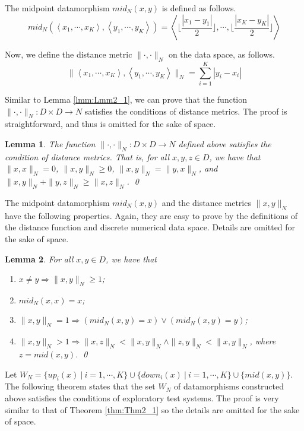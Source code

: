 \documentclass[preprint,1p,authoryear,times]{elsarticle}
\newtheorem{Lemma}{Lemma}
\begin{document}
The midpoint datamorphism $mid_N(x,y)$ is defined as follows. 
\begin{equation}
mid_N(\left<x_1, \cdots, x_K\right>, \left<y_1, \cdots, y_K\right>) = \left<\lfloor \frac{|x_1 - y_1|}{2}\rfloor, \cdots, \lfloor \frac{|x_K - y_K|}{2}\rfloor\right>
\end{equation}

Now, we define the distance metric $\|\cdot,\cdot\|_N$ on the data space, as follows. 
\begin{equation}
\|\left<x_1, \cdots, x_K\right>, \left<y_1, \cdots, y_K\right>\|_N = \sum^K_{i=1}{|y_i - x_i|}
\end{equation}

Similar to Lemma \ref{lmm:Lmm2_1}, we can prove that the function $\| \cdot, \cdot \|_N : D \times D \rightarrow N$ satisfies the conditions of distance metrics. The proof is straightforward, and thus is omitted for the sake of space. 
\begin{Lemma}
The function $\|\cdot,\cdot \|_N: D \times D \rightarrow N$ defined above satisfies the condition of distance metrics. That is, for all $x,y,z \in D$, we have that $\|x, x\|_N=0$, $\|x,y\|_N\geq 0$, $\|x,y\|_N = \|y,x\|_N$, and $\|x,y\|_N + \|y,z\|_N \geq \|x,z\|_N$. \qed
\end{Lemma}

The midpoint datamorphism $mid_N(x,y)$ and the distance metrics $\|x,y\|_N$ have the following properties. Again, they are easy to prove by the definitions of the distance function and discrete numerical data space. Details are omitted for the sake of space.
\begin{Lemma}\label{lmm:Lmm2_3}
For all $x,y \in D$, we have that 
\begin{enumerate}
\item $x \neq y \Rightarrow \|x,y\|_N \geq 1$;
\item $mid_N(x,x) = x$;
\item $\|x,y\|_N = 1 \Rightarrow (mid_N(x,y)=x) \vee (mid_N(x,y)=y)$;
\item $\|x,y\|_N > 1 \Rightarrow \|x,z\|_N < \|x,y\|_N \wedge \|z,y\|_N < \|x,y\|_N$, where $z=mid(x,y)$. \qed
\end{enumerate} 
\end{Lemma}

Let  $W_N = \{ up_i(x) ~|~ i=1, \cdots, K\} \cup \{down_i(x) ~|~ i=1, \cdots, K\} \cup \{mid(x, y)\}$. The following theorem states that the set $W_N$ of datamorphisms constructed above satisfies the conditions of exploratory test systems. The proof is very similar to that of Theorem \ref{thm:Thm2_1} so the details are omitted for the sake of space.
\end{document}
